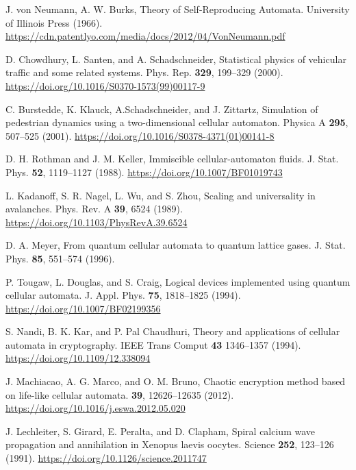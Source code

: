 \begin{thebibliography}{04}


\raggedright
J. von Neumann, A. W. Burks, 
Theory of Self-Reproducing Automata. 
University of Illinois Press (1966).
\url{https://cdn.patentlyo.com/media/docs/2012/04/VonNeumann.pdf}



\raggedright
D. Chowdhury, L. Santen, and A. Schadschneider,
Statistical physics of vehicular traffic and some related systems.
Phys. Rep. \textbf{329}, 199--329 (2000).
\url{https://doi.org/10.1016/S0370-1573(99)00117-9}


\raggedright
C. Burstedde, K. Klauck, A.Schadschneider, and J. Zittartz,
Simulation of pedestrian dynamics using a two-dimensional cellular automaton. 
Physica A \textbf{295}, 507--525 (2001).
\url{https://doi.org/10.1016/S0378-4371(01)00141-8}

\raggedright
D. H. Rothman and J. M. Keller,
Immiscible cellular-automaton fluids.
J. Stat. Phys. \textbf{52}, 1119--1127 (1988). 
\url{https://doi.org/10.1007/BF01019743}

\raggedright
L. Kadanoff, S. R. Nagel, L. Wu, and S. Zhou,
Scaling and universality in avalanches.
Phys. Rev. A \textbf{39}, 6524 (1989).
\url{https://doi.org/10.1103/PhysRevA.39.6524}

\raggedright
D. A. Meyer,
From quantum cellular automata to quantum lattice gases.
J. Stat. Phys. \textbf{85}, 551--574 (1996).
\url{}

\raggedright
P. Tougaw, L. Douglas, and S. Craig,
Logical devices implemented using quantum cellular automata.
J. Appl. Phys. \textbf{75}, 1818--1825 (1994).
\url{https://doi.org/10.1007/BF02199356}

\raggedright
S. Nandi, B. K. Kar, and P. Pal Chaudhuri,
Theory and applications of cellular automata in cryptography.
IEEE Trans Comput \textbf{43} 1346--1357 (1994).
\url{https://doi.org/10.1109/12.338094}

\raggedright
J. Machiacao, A. G. Marco, and O. M. Bruno,
Chaotic encryption method based on life-like cellular automata.
\textbf{39}, 12626--12635 (2012).
\url{https://doi.org/10.1016/j.eswa.2012.05.020}

\raggedright
J. Lechleiter, S. Girard, E. Peralta, and D. Clapham,
Spiral calcium wave propagation and annihilation in Xenopus laevis oocytes.
Science \textbf{252}, 123--126 (1991).
\url{https://doi.org/10.1126/science.2011747}


\end{thebibliography}
